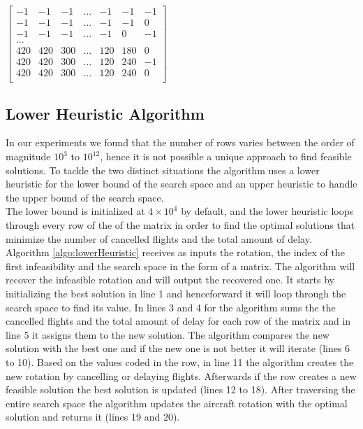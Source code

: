 $\begin{bmatrix}
	-1	&  -1	&  -1	& ...	&  -1 &	  -1 &	-1\\
	-1	&  -1	&  -1	& ...	&  -1 &	  -1 &	0\\
	-1	&  -1	&  -1	& ...	&  -1 &	   0 &	-1\\
	...	&		&		&       &     &      &      \\    	
	420	& 420	& 300	& ...	& 120 &	 180 &	0\\
	420	& 420	& 300	& ...	& 120 &	 240 &	-1\\
	420	& 420	& 300	& ...	& 120 &	 240 &	0\\
\end{bmatrix}$

\subsection{Lower Heuristic Algorithm} \label{sec:lowerHeuristic}

In our experiments we found that the number of rows varies between the order of magnitude $10^3$ to $10^{12}$, hence it is not possible a unique approach to find feasible solutions. To tackle the two distinct situations the algorithm uses a lower heuristic for the lower bound of the search space and an upper heuristic to handle the upper bound of the search space.\\
The lower bound is initialized at $4 \times 10^4$ by default, and the lower heuristic loops through every row of the of the matrix in order to find the optimal solutions that minimize the number of cancelled flights and the total amount of delay. Algorithm \ref{algo:lowerHeuristic} receives as inputs the rotation, the index of the first infeasibility and the search space in the form of a matrix. The algorithm will recover the infeasible rotation and will output the recovered one. It starts by initializing the best solution in line 1 and henceforward it will loop through the search space to find its value. In lines 3 and 4 for the algorithm sums the the cancelled flights and the total amount of delay for each row of the matrix and in line 5 it assigns them to the new solution. The algorithm compares the new solution with the best one and if the new one is not better it will iterate (lines 6 to 10). Based on the values coded in the row, in line 11 the algorithm creates the new rotation by cancelling or delaying flights. Afterwards if the row creates a new feasible solution the best solution is updated (lines 12 to 18). After traversing the entire search space the algorithm updates the aircraft rotation with the optimal solution and returns it (lines 19 and 20).\\

